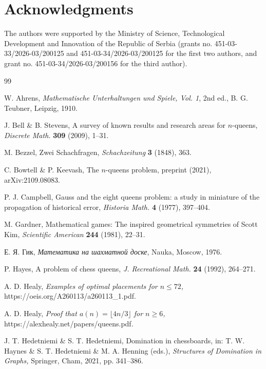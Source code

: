 \documentclass[10pt,a4paper]{article}
\theoremstyle{definition}
\begin{document}
\section*{Acknowledgments}

The authors were supported by the Ministry of Science, Technological Development and Innovation of the Republic of Serbia (grants no. 451-03-33/2026-03/200125 and 451-03-34/2026-03/200125 for the first two authors, and grant no. 451-03-34/2026-03/200156 for the third author).

\sloppy

\begin{thebibliography}{99}
\raggedright

W. Ahrens, \emph{Mathematische Unterhaltungen und Spiele, Vol. 1}, 2nd ed.,
B. G. Teubner, Leipzig, 1910.

J. Bell \& B. Stevens, A survey of known results and research areas for
$n$-queens, \emph{Discrete Math.} \textbf{309} (2009), 1--31.

M. Bezzel, Zwei Schachfragen, \emph{Schachzeitung} \textbf{3} (1848), 363.

C. Bowtell \& P. Keevash, The $n$-queens problem, preprint (2021),
arXiv:2109.08083.

P. J. Campbell, Gauss and the eight queens problem: a study in miniature of the
propagation of historical error, \emph{Historia Math.} \textbf{4} (1977),
397--404.


M. Gardner, Mathematical games: The inspired geometrical symmetries of Scott Kim,
\emph{Scientific American} \textbf{244} (1981), 22--31.

Е. Я. Гик, \emph{Математика на шахматной доске},
Nauka, Moscow, 1976.

P. Hayes, A problem of chess queens, \emph{J. Recreational Math.} \textbf{24} (1992), 264--271.

A. D. Healy, \emph{Examples of optimal placements for $n\leqslant72$,}
https://oeis.org/A260113/a260113\_1.pdf.

A. D. Healy, \emph{Proof that $a(n)=\lfloor4n/3\rfloor$ for $n\geqslant6$,}
https://alexhealy.net/papers/queens.pdf.

J. T. Hedetniemi \& S. T. Hedetniemi, Domination in chessboards, in:
T. W. Haynes \& S. T. Hedetniemi \& M. A. Henning (eds.), \emph{Structures of
Domination in Graphs,} Springer, Cham, 2021, pp. 341--386.




\end{thebibliography}
\end{document}
